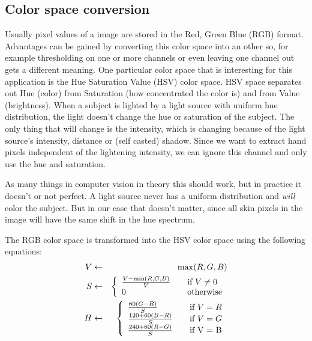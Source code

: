 \subsection*{Color space conversion}
Usually pixel values of a image are stored in the Red, Green Blue (RGB) format. Advantages can be gained by converting this color space into an other so, for example thresholding on one or more channels or even leaving one channel out gets a different meaning. One particular color space that is interesting for this application is the Hue Saturation Value (HSV) color space. HSV space separates out Hue (color) from Saturation (how concentrated the color is) and from Value (brightness). When a subject is lighted by a light source with uniform hue distribution, the light doesn't change the hue or saturation of the subject. The only thing that will change is the intensity, which is changing because of the light source's intensity, distance or (self casted) shadow. Since we want to extract hand pixels independent of the lightening intensity, we can ignore this channel and only use the hue and saturation.

As many things in computer vision in theory this should work, but in practice it doesn't or not perfect. A light source never has a uniform distribution and \emph{will} color the subject. But in our case that doesn't matter, since all skin pixels in the image will have the same shift in the hue spectrum.

The RGB color space is transformed into the HSV color space using the following equations:
\begin{eqnarray*}
  V & \leftarrow & \max(R,G,B) \\
  S & \leftarrow & \left\{
  \begin{array}{l l}
    \frac{V-\min(R, G, B)}{V} & \quad \text{if $V \neq 0$} \\
    0 						  & \quad \text{otherwise} \\
  \end{array} \right.\\
  H & \leftarrow & \left\{
  \begin{array}{l l}
    \frac{60(G - B)}{S}     & \quad \text{if $V = R$} \\
    \frac{120 + 60(B-R)}{S} & \quad \text{if $V = G$} \\
    \frac{240 + 60(R-G)}{S} & \quad \text{if V = B} \\
  \end{array} \right.\\
\end{eqnarray*}

